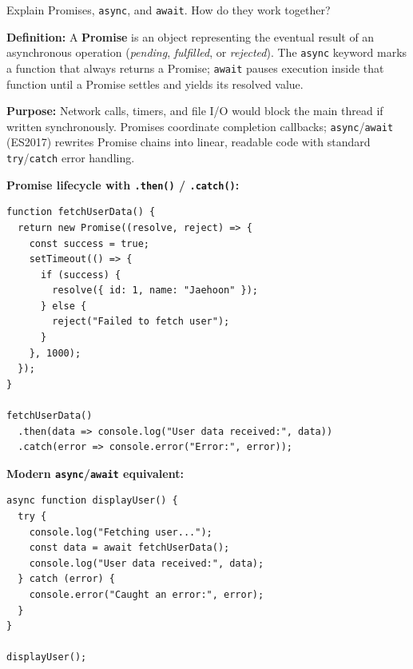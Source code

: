 \question[6]
Explain Promises, \lstinline[style=jsinline]|async|, and \lstinline[style=jsinline]|await|. How do they work together?
\begin{solutionorbox}[4.75in]
\textbf{Definition:} A \textbf{Promise} is an object representing the eventual result of an asynchronous operation (\emph{pending}, \emph{fulfilled}, or \emph{rejected}). The \lstinline[style=jsinline]|async| keyword marks a function that always returns a Promise; \lstinline[style=jsinline]|await| pauses execution inside that function until a Promise settles and yields its resolved value.

\textbf{Purpose:} Network calls, timers, and file I/O would block the main thread if written synchronously. Promises coordinate completion callbacks; \lstinline[style=jsinline]|async|/\lstinline[style=jsinline]|await| (ES2017) rewrites Promise chains into linear, readable code with standard \lstinline[style=jsinline]|try|/\lstinline[style=jsinline]|catch| error handling.

\textbf{Promise lifecycle with \lstinline[style=jsinline]|.then()| / \lstinline[style=jsinline]|.catch()|:}
\begin{lstlisting}[style=js]
function fetchUserData() {
  return new Promise((resolve, reject) => {
    const success = true;
    setTimeout(() => {
      if (success) {
        resolve({ id: 1, name: "Jaehoon" });
      } else {
        reject("Failed to fetch user");
      }
    }, 1000);
  });
}

fetchUserData()
  .then(data => console.log("User data received:", data))
  .catch(error => console.error("Error:", error));
\end{lstlisting}

\textbf{Modern \lstinline[style=jsinline]|async|/\lstinline[style=jsinline]|await| equivalent:}
\begin{lstlisting}[style=js]
async function displayUser() {
  try {
    console.log("Fetching user...");
    const data = await fetchUserData();
    console.log("User data received:", data);
  } catch (error) {
    console.error("Caught an error:", error);
  }
}

displayUser();
\end{lstlisting}


\end{solutionorbox}

